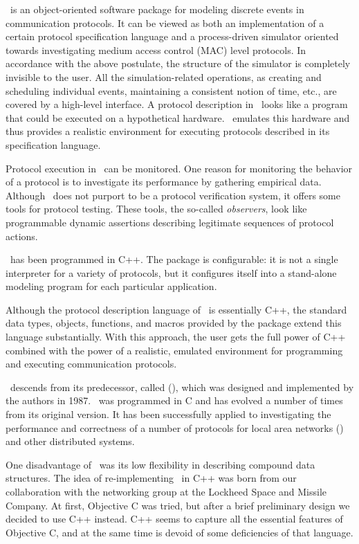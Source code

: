 \smurph\ is an object-oriented software package for modeling discrete events
in communication protocols.
It can be viewed as both an implementation of a certain protocol specification
language and a process-driven simulator oriented towards investigating
medium access control (MAC) level protocols.
In accordance with the above postulate,
the structure of the simulator is completely invisible to the user.
All the simulation-related operations, as creating and scheduling
individual events, maintaining a consistent notion of time, etc.,
are covered by a high-level interface.
A protocol description in \smurph\ looks like a program that
could be executed on a hypothetical hardware.
\smurph\ emulates this hardware and thus provides a realistic environment
for executing protocols described in its specification language.

Protocol execution in \smurph\ can be monitored.
One reason for monitoring the behavior of a protocol is to investigate its
performance by gathering empirical data.
Although \smurph\ does not purport to be a protocol verification system,
it offers some tools for protocol testing.
These tools, the so-called {\em observers}, look like programmable dynamic
assertions describing legitimate sequences of protocol actions.

\smurph\ has been programmed in C++.
The package is configurable: it is not a single interpreter for a variety of
protocols, but it configures itself into a stand-alone modeling program
for each particular application.

Although the protocol description language of \smurph\ is essentially C++,
the standard data types, objects, functions, and macros provided by the
package extend this language substantially.
With this approach, the user gets the full power of C++ combined
with the power of a realistic, emulated environment for programming and
executing communication protocols.

\smurph\ descends from its predecessor, called \lansf (\cite{gbr90a}),
which was designed
and implemented by the authors in 1987.
\lansf\ was programmed in C and has evolved a number of times from its
original version.
It has been successfully applied to investigating the performance and
correctness of a number of protocols for local area networks
(\cite{dog88,dog89,dgr90,dgr90a,gbr87,gbr87a,gbr89a,gbr88c}) and
other distributed systems.

One disadvantage of \lansf\ was its low flexibility in describing
compound data structures.
The idea of re-implementing \lansf\ in C++ was born from our collaboration
with the networking group at the Lockheed Space and Missile Company.
At first, Objective C was tried, but after a brief preliminary design we
decided to use C++ instead.
C++ seems to capture all the essential features of Objective C, and at the same
time is devoid of some deficiencies of that language.
